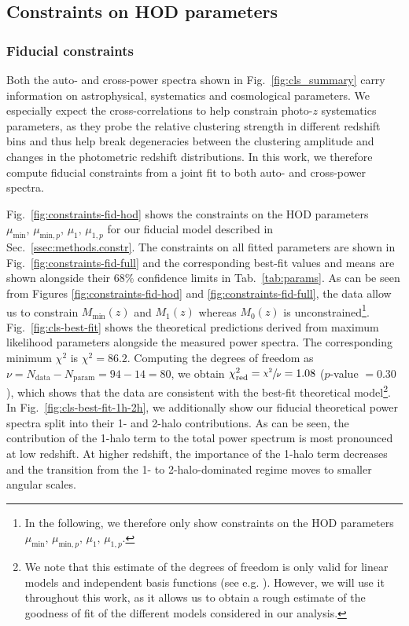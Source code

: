 \documentclass[a4paper,11pt]{article}
\begin{document}
  \subsection{Constraints on HOD parameters}\label{ssec:results.hod-constraints}
    \subsubsection{Fiducial constraints}\label{sssec:results.hod-constraints.fiducial}
      Both the auto- and cross-power spectra shown in Fig.~\ref{fig:cls_summary} carry information on astrophysical, systematics and cosmological parameters. We especially expect the cross-correlations to help constrain photo-$z$ systematics parameters, as they probe the relative clustering strength in different redshift bins and thus help break degeneracies between the clustering amplitude and changes in the photometric redshift distributions. In this work, we therefore compute fiducial constraints from a joint fit to both auto- and cross-power spectra.

      Fig.~\ref{fig:constraints-fid-hod} shows the constraints on the HOD parameters $\mu_{\mathrm{min}}, \allowbreak \, \mu_{\mathrm{min}, p}, \allowbreak \, \mu_{1}, \allowbreak \, \mu_{1, p}$ for our fiducial model described in Sec.~\ref{ssec:methods.constr}. The constraints on all fitted parameters are shown in Fig.~\ref{fig:constraints-fid-full} and the corresponding best-fit values and means are shown alongside their $68 \%$ confidence limits in Tab.~\ref{tab:params}. As can be seen from Figures \ref{fig:constraints-fid-hod} and \ref{fig:constraints-fid-full}, the data allow us to constrain $M_{\mathrm{min}}(z)$ and $M_{1}(z)$ whereas $M_{0}(z)$ is unconstrained\footnote{In the following, we therefore only show constraints on the HOD parameters $\mu_{\mathrm{min}}, \, \mu_{\mathrm{min}, p}, \, \mu_{1}, \, \mu_{1, p}$.}. Fig.~\ref{fig:cls-best-fit} shows the theoretical predictions derived from maximum likelihood parameters alongside the measured power spectra. The corresponding minimum $\chi^{2}$ is $\chi^{2} = 86.2$. Computing the degrees of freedom as $\nu = N_{\mathrm{data}} - N_{\mathrm{param}} = 94 - 14 = 80$, we obtain $\chi^{2}_{\mathrm{red}} = \sfrac{\chi^{2}}{\nu} = 1.08$ ($p$-value $= 0.30$), which shows that the data are consistent with the best-fit theoretical model\footnote{We note that this estimate of the degrees of freedom is only valid for linear models and independent basis functions (see e.g. \cite{Andrae:2010}). However, we will use it throughout this work, as it allows us to obtain a rough estimate of the goodness of fit of the different models considered in our analysis.}. In Fig.~\ref{fig:cls-best-fit-1h-2h}, we additionally show our fiducial theoretical power spectra split into their 1- and 2-halo contributions. As can be seen, the contribution of the 1-halo term to the total power spectrum is most pronounced at low redshift. At higher redshift, the importance of the 1-halo term decreases and the transition from the 1- to 2-halo-dominated regime moves to smaller angular scales.
\end{document}
